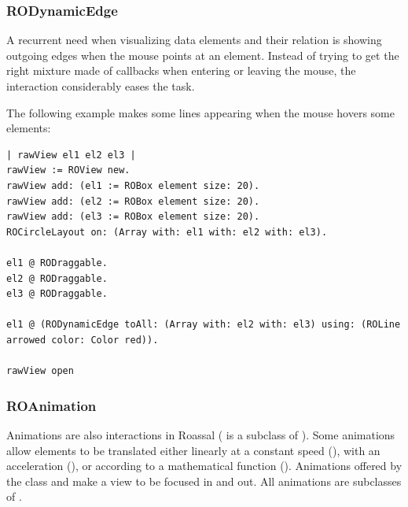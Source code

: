 \documentclass[a4paper,10pt,twoside]{book}
\begin{document}
%
%

\subsubsection{RODynamicEdge} A recurrent need when visualizing data elements and their relation is showing outgoing edges when the mouse points at an element. Instead of trying to get the right mixture made of callbacks when entering or leaving the mouse, the interaction  considerably eases the task.

The following example makes some lines appearing when the mouse hovers some elements:

\begin{lstlisting}
| rawView el1 el2 el3 |
rawView := ROView new.
rawView add: (el1 := ROBox element size: 20).
rawView add: (el2 := ROBox element size: 20).
rawView add: (el3 := ROBox element size: 20).
ROCircleLayout on: (Array with: el1 with: el2 with: el3).
	
el1 @ RODraggable.
el2 @ RODraggable.
el3 @ RODraggable.
	
el1 @ (RODynamicEdge toAll: (Array with: el2 with: el3) using: (ROLine arrowed color: Color red)).

rawView open
\end{lstlisting}

\subsubsection{ROAnimation}
Animations are also interactions in Roassal (\ie {} is a subclass of ). Some animations allow elements to be translated either linearly at a constant speed (), with an acceleration (), or according to a mathematical function (). Animations offered by the class  and  make a view to be focused in and out. All animations are subclasses of .
\end{document}
